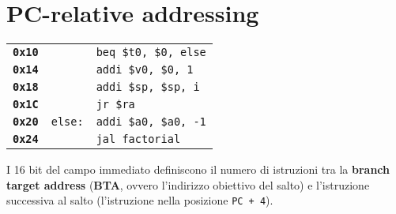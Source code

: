 \documentclass[../main.tex]{subfiles}
\begin{document}
    \section{PC-relative addressing}
    \begin{table}[h!]
        \begin{minipage}{.03\linewidth}
            \hspace*{0cm}
        \end{minipage}
        \begin{minipage}{.97\linewidth}
            \begin{tabular}{ l l l }
                \textbf{\texttt{0x10}} & & \texttt{beq \$t0, \$0, else} \\
                \textbf{\texttt{0x14}} & & \texttt{addi \$v0, \$0, 1} \\
                \textbf{\texttt{0x18}} & & \texttt{addi \$sp, \$sp, i} \\
                \textbf{\texttt{0x1C}} & & \texttt{jr \$ra} \\
                \textbf{\texttt{0x20}} & \texttt{else:} & \texttt{addi \$a0, \$a0, -1} \\
                \textbf{\texttt{0x24}} & & \texttt{jal factorial} \\
            \end{tabular}
        \end{minipage}
    \end{table}

    \noindent
    I 16 bit del campo immediato definiscono il numero di istruzioni
    tra la \textbf{branch target address} (\textbf{BTA}, ovvero
    l'indirizzo obiettivo del salto) e l'istruzione successiva
    al salto (l'istruzione nella posizione \texttt{PC + 4}).
\end{document}
